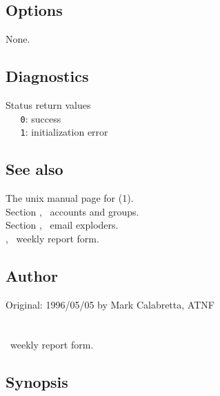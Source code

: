 \subsection*{Options}
 
None.

\subsection*{Diagnostics}
 
Status return values
\\ \verb+   0+: success
\\ \verb+   1+: initialization error

\subsection*{See also}

The unix manual page for (1).\\
Section , \aipspp\ accounts and groups.\\
Section , \aipspp\ email exploders.\\
, \aipspp\ weekly report form.

\subsection*{Author}
 
Original: 1996/05/05 by Mark Calabretta, ATNF


\newpage
\section{}
\label{report_form}



\aipspp\ weekly report form.

\subsection*{Synopsis}
 
\begin{synopsis}
\end{synopsis}
 
